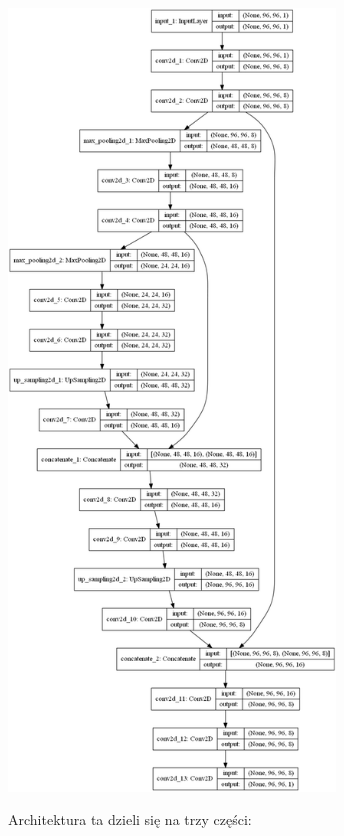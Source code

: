 \documentclass[a4paper,11pt,twoside]{report}
\theoremstyle{definition}
\begin{document}
\begin{minipage}{\linewidth}
	\centering
	\includegraphics[width=0.65\textwidth]{segmentation/our_architecture.png}
\end{minipage}


Architektura ta dzieli się na trzy części:
\end{document}
